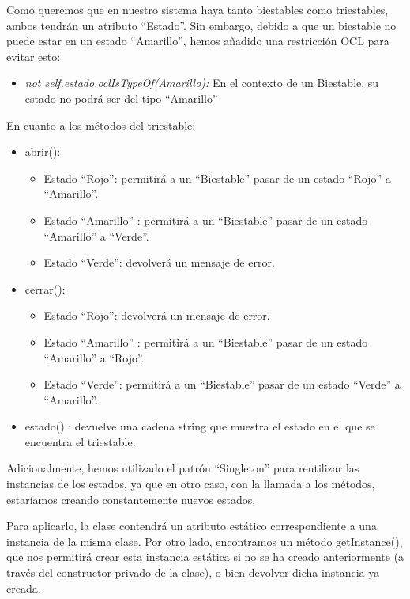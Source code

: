 \documentclass[11pt,a4paper]{article}
\begin{document}
Como queremos que en nuestro sistema haya tanto biestables como triestables, ambos tendrán un atributo ``Estado''. Sin embargo, debido a que un biestable no puede estar en un estado ``Amarillo'', hemos añadido una restricción OCL para evitar esto:

\begin{itemize}
\item \emph{not self.estado.oclIsTypeOf(Amarillo):} En el contexto de un Biestable, su estado no podrá ser del tipo ``Amarillo''
\end{itemize}


En cuanto a los métodos del triestable:

\begin{itemize}
\item abrir():

	\begin{itemize}
	\item Estado ``Rojo'': permitirá a un ``Biestable'' pasar de un estado ``Rojo'' a ``Amarillo''.
	\item Estado ``Amarillo'' : permitirá a un ``Biestable'' pasar de un estado ``Amarillo'' a ``Verde''.

	\item Estado ``Verde'': devolverá un mensaje de error.
	\end{itemize}
	
\item cerrar():

	\begin{itemize}
	\item Estado ``Rojo'': devolverá un mensaje de error.
	\item Estado ``Amarillo'' : permitirá a un ``Biestable'' pasar de un estado ``Amarillo'' a ``Rojo''.
	\item Estado ``Verde'':  permitirá a un ``Biestable'' pasar de un estado ``Verde'' a ``Amarillo''.

	\end{itemize}
	
\item estado() : devuelve una cadena string que muestra el estado en el que se encuentra el triestable.
\end{itemize}


Adicionalmente, hemos utilizado el patrón “Singleton” para reutilizar las instancias de los estados, ya que en otro caso, con la llamada a los métodos, estaríamos creando constantemente nuevos estados.

Para aplicarlo, la clase contendrá un atributo estático correspondiente a una instancia de la misma clase. Por otro lado, encontramos un método getInstance(), que nos permitirá crear esta instancia estática si no se ha creado anteriormente (a través del constructor privado de la clase), o bien devolver dicha instancia ya creada.
\end{document}
